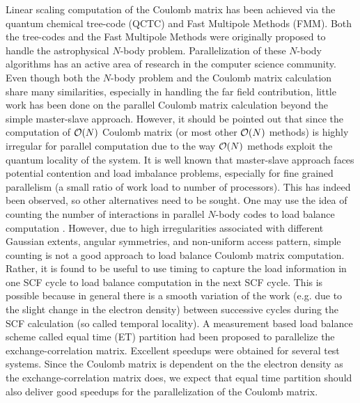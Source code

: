 \commentoutA{\documentclass[prl,aps,twocolumn,twocolumngrid,superbib]{revtex4}}
\begin{document}
Linear scaling computation of the Coulomb matrix has been achieved via
the quantum chemical tree-code
(QCTC)\cite{MChallacombe96,MChallacombe96B,MChallacombe97} and Fast
Multipole Methods (FMM)\cite{CWhite94B,CWhite96A,MStrain96}.  Both the
tree-codes\cite{JBarnes86} and the Fast Multipole
Methods\cite{LGreengard87,CRAnderson92} were originally proposed to
handle the astrophysical $N$-body problem.  Parallelization of these
$N$-body algorithms has an active area of research in the computer
science
community\cite{MWarren92,AGrama94,MWarren95b,Singh93,Singh_95v27,YHu96,Grama_98v24,PGibbon02,Antonuccio-Delogu03}.
Even though both the $N$-body problem and the Coulomb matrix
calculation share many similarities, especially in handling the far
field contribution, little work has been done on the parallel Coulomb
matrix calculation beyond the simple master-slave
approach\cite{Sosa_98v19,Furlani_00v128,Sosa_00v26}.  However, it
should be pointed out that since the computation of ${\cal O}(N)$
Coulomb matrix (or most other ${\cal O}(N)$ methods) is highly
irregular for parallel computation due to the way ${\cal O}(N)$
methods exploit the quantum locality of the system.  It is well known
that master-slave approach faces potential contention and load
imbalance problems\cite{BWilkinson99,GWilson95}, especially for fine
grained parallelism (a small ratio of work load to number of
processors).  This has indeed been observed\cite{Guerra_95,CGan03}, so
other alternatives need to be sought.  One may use the idea of
counting the number of interactions in parallel $N$-body codes to load
balance computation
\cite{MWarren95b,Singh93,Singh_95v27,MWarren93}.
However, due to high irregularities associated with different Gaussian
extents, angular symmetries, and non-uniform access pattern, simple
counting is not a good approach to load balance Coulomb matrix
computation. Rather, it is found to be useful to use timing to capture
the load information in one SCF cycle to load balance computation in
the next SCF cycle. This is possible because in general there is a
smooth variation of the work (e.g. due to the slight change in the
electron density) between successive cycles during the SCF calculation
(so called temporal locality\cite{JPilkington96}).  A measurement
based load balance scheme called equal time (ET) partition
\cite{CGan03} had been proposed to parallelize the
exchange-correlation matrix. Excellent speedups were obtained for
several test systems.  Since the Coulomb matrix is dependent on the
the electron density as the exchange-correlation matrix does, we
expect that equal time partition should also deliver good speedups for
the parallelization of the Coulomb matrix.
\end{document}
